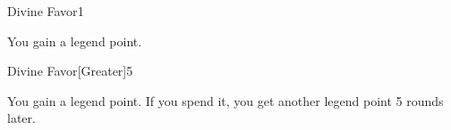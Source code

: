 \begin{spellsection}{Divine Favor}{1}
    \begin{spellheader}
        \spelldur \durshort
    \end{spellheader}
    \begin{spellcontent}
        \begin{spelltargetinginfo}
        \end{spelltargetinginfo}
        \begin{spelleffects}
            \spelleffect You gain a legend point.
            \spelldur \durshort \dismissable
        \end{spelleffects}
    \end{spellcontent}
    \begin{spellfooter}
        \miscastexplode
    \end{spellfooter}
\end{spellsection}

\begin{spellsection}{Divine Favor}[Greater]{5}
    \begin{spellheader}
    \end{spellheader}
    \begin{spellcontent}
        \begin{spelltargetinginfo}
        \end{spelltargetinginfo}
        \begin{spelleffects}
            \spelleffect You gain a legend point. If you spend it, you get another legend point 5 rounds later.
            \spelldur \durlong \dismissable
        \end{spelleffects}
    \end{spellcontent}
    \begin{spellfooter}
        \miscastexplode
    \end{spellfooter}
\end{spellsection}


